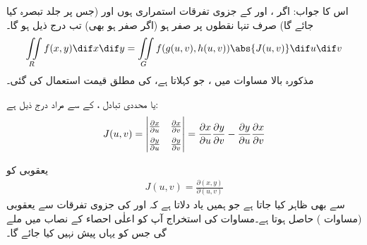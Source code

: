 اس کا جواب: اگر ،  اور  کے جزوی تفرقات استمراری ہوں اور  (جس پر جلد تبصرہ کیا جائے گا) صرف  تنہا نقطوں پر صفر ہو (اگر صفر ہو بھی)  تب درج ذیل ہو گا۔ 
\begin{align}\label{مساوات_بالکثرت_یعقوبی_بدل}
\iint\limits_{R} f(x,y)\dif x\dif y=\iint\limits_G f(g(u,v),h(u,v))\abs{J(u,v)}\dif u\dif v
\end{align}
مذکورہ بالا مساوات میں ، جو  کہلاتا ہے، کی مطلق قیمت استعمال کی گئی۔


   یا محددی تبادل ،  کے  سے مراد درج ذیل ہے:
\begin{align}\label{مساوات_بالکثرت_یعقوبی_تعریف}
\renewcommand{\arraystretch}{1.5}
J(u,v)=\begin{vmatrix}
\frac{\partial x}{\partial u}&\frac{\partial x}{\partial v}\\
\frac{\partial y}{\partial u}&\frac{\partial y}{\partial v}
\end{vmatrix}=
\frac{\partial x}{\partial u}\frac{\partial y}{\partial v}-\frac{\partial y}{\partial u}\frac{\partial x}{\partial v}
\end{align}


یعقوبی کو 
\begin{align*}
J(u,v)=\frac{\partial(x,y)}{\partial(u,v)}
\end{align*}
سے بھی ظاہر کیا جاتا ہے جو ہمیں یاد دلاتا ہے کہ  اور  کی جزوی تفرقات سے یعقوبی (مساوات )  حاصل ہوتا ہے۔مساوات  کی استخراج آپ کو اعلٰی احصاء کے نصاب میں ملے گی جس کو یہاں پیش نہیں کیا جائے گا۔







